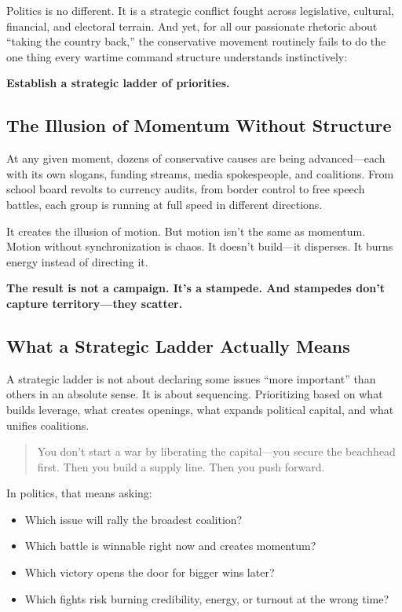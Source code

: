 Politics is no different. It is a strategic conflict fought across legislative, cultural, financial, and electoral terrain. And yet, for all our passionate rhetoric about “taking the country back,” the conservative movement routinely fails to do the one thing every wartime command structure understands instinctively:

\textbf{Establish a strategic ladder of priorities.}

\subsection*{The Illusion of Momentum Without Structure}

At any given moment, dozens of conservative causes are being advanced—each with its own slogans, funding streams, media spokespeople, and coalitions. From school board revolts to currency audits, from border control to free speech battles, each group is running at full speed in different directions.

It creates the illusion of motion. But motion isn’t the same as momentum. Motion without synchronization is chaos. It doesn’t build—it disperses. It burns energy instead of directing it.

\textbf{The result is not a campaign. It’s a stampede. And stampedes don’t capture territory—they scatter.}

\subsection*{What a Strategic Ladder Actually Means}

A strategic ladder is not about declaring some issues “more important” than others in an absolute sense. It is about sequencing. Prioritizing based on what builds leverage, what creates openings, what expands political capital, and what unifies coalitions.

\begin{quote}
    You don’t start a war by liberating the capital—you secure the beachhead first. Then you build a supply line. Then you push forward.
\end{quote}

In politics, that means asking:
\begin{itemize}
    \item Which issue will rally the broadest coalition?
    \item Which battle is winnable right now and creates momentum?
    \item Which victory opens the door for bigger wins later?
    \item Which fights risk burning credibility, energy, or turnout at the wrong time?
\end{itemize}

